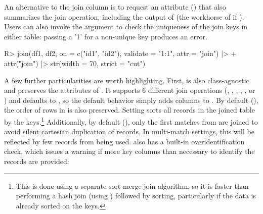 \documentclass[nojss]{jss} %
\newcommand{\fct}[1]{\code{#1()}}
\begin{document}
%
An alternative to the join column is to request an attribute () that also summarizes the join operation, including the output of \fct{fmatch} (the workhorse of \fct{join} if ). Users can also invoke the  argument to check the uniqueness of the join keys in either table: passing a '1' for a non-unique key produces an error.
%
\begin{Schunk}
\begin{Sinput}
R> join(df1, df2, on = c("id1", "id2"), validate = "1:1", attr = "join") |>
+    attr("join") |> str(width = 70, strict = "cut")
\end{Sinput}
\end{Schunk}
%
A few further particularities are worth highlighting. First,  is also class-agnostic and preserves the attributes of . It supports 6 different join operations (, , , , , or ) and defaults to , so the default behavior simply adds columns to . By default (), the order of rows in  is also preserved. Setting  sorts all records in the joined table by the keys.\footnote{This is done using a separate sort-merge-join algorithm, so it is faster than performing a hash join (using \fct{fmatch}) followed by sorting, particularly if the data is already sorted on the keys. } Additionally, by default (), only the first matches from  are joined to avoid silent cartesian duplication of records. In multi-match settings, this will be reflected by few records from  being used. \fct{fmatch} also has a built-in overidentification check, which issues a warning if more key columns than necessary to identify the records are provided:
%
\end{document}
